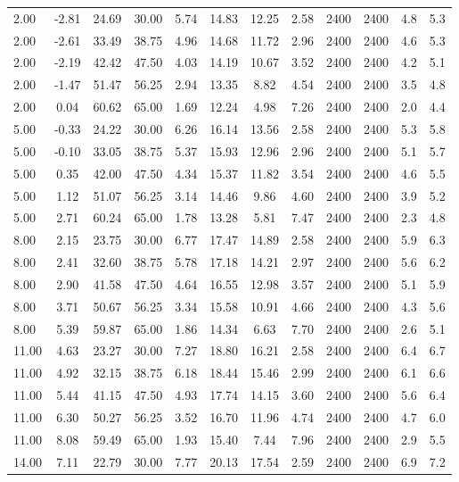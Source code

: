 \documentclass[english]{SPFShortReport}
\begin{document}
\begin{table}[!ht]
\begin{small}
\begin{center}
{\begin{tabular}{l | c c c c c c c c c c c }
2.00 & -2.81 & 24.69 & 30.00 & 5.74 & 14.83 & 12.25 & 2.58 & 2400 & 2400 & 4.8 & 5.3\\ 
2.00 & -2.61 & 33.49 & 38.75 & 4.96 & 14.68 & 11.72 & 2.96 & 2400 & 2400 & 4.6 & 5.3\\ 
2.00 & -2.19 & 42.42 & 47.50 & 4.03 & 14.19 & 10.67 & 3.52 & 2400 & 2400 & 4.2 & 5.1\\ 
2.00 & -1.47 & 51.47 & 56.25 & 2.94 & 13.35 & 8.82 & 4.54 & 2400 & 2400 & 3.5 & 4.8\\ 
2.00 & 0.04 & 60.62 & 65.00 & 1.69 & 12.24 & 4.98 & 7.26 & 2400 & 2400 & 2.0 & 4.4\\ 
5.00 & -0.33 & 24.22 & 30.00 & 6.26 & 16.14 & 13.56 & 2.58 & 2400 & 2400 & 5.3 & 5.8\\ 
5.00 & -0.10 & 33.05 & 38.75 & 5.37 & 15.93 & 12.96 & 2.96 & 2400 & 2400 & 5.1 & 5.7\\ 
5.00 & 0.35 & 42.00 & 47.50 & 4.34 & 15.37 & 11.82 & 3.54 & 2400 & 2400 & 4.6 & 5.5\\ 
5.00 & 1.12 & 51.07 & 56.25 & 3.14 & 14.46 & 9.86 & 4.60 & 2400 & 2400 & 3.9 & 5.2\\ 
5.00 & 2.71 & 60.24 & 65.00 & 1.78 & 13.28 & 5.81 & 7.47 & 2400 & 2400 & 2.3 & 4.8\\ 
8.00 & 2.15 & 23.75 & 30.00 & 6.77 & 17.47 & 14.89 & 2.58 & 2400 & 2400 & 5.9 & 6.3\\ 
8.00 & 2.41 & 32.60 & 38.75 & 5.78 & 17.18 & 14.21 & 2.97 & 2400 & 2400 & 5.6 & 6.2\\ 
8.00 & 2.90 & 41.58 & 47.50 & 4.64 & 16.55 & 12.98 & 3.57 & 2400 & 2400 & 5.1 & 5.9\\ 
8.00 & 3.71 & 50.67 & 56.25 & 3.34 & 15.58 & 10.91 & 4.66 & 2400 & 2400 & 4.3 & 5.6\\ 
8.00 & 5.39 & 59.87 & 65.00 & 1.86 & 14.34 & 6.63 & 7.70 & 2400 & 2400 & 2.6 & 5.1\\ 
11.00 & 4.63 & 23.27 & 30.00 & 7.27 & 18.80 & 16.21 & 2.58 & 2400 & 2400 & 6.4 & 6.7\\ 
11.00 & 4.92 & 32.15 & 38.75 & 6.18 & 18.44 & 15.46 & 2.99 & 2400 & 2400 & 6.1 & 6.6\\ 
11.00 & 5.44 & 41.15 & 47.50 & 4.93 & 17.74 & 14.15 & 3.60 & 2400 & 2400 & 5.6 & 6.4\\ 
11.00 & 6.30 & 50.27 & 56.25 & 3.52 & 16.70 & 11.96 & 4.74 & 2400 & 2400 & 4.7 & 6.0\\ 
11.00 & 8.08 & 59.49 & 65.00 & 1.93 & 15.40 & 7.44 & 7.96 & 2400 & 2400 & 2.9 & 5.5\\ 
14.00 & 7.11 & 22.79 & 30.00 & 7.77 & 20.13 & 17.54 & 2.59 & 2400 & 2400 & 6.9 & 7.2\\ 

\end{tabular}}
\end{center}
\end{small}
\end{table}
\end{document}
